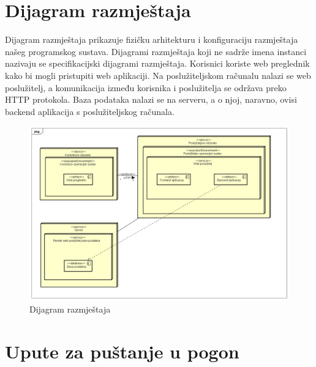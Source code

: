 			\eject 
		
		
		\section{Dijagram razmještaja}
			
		\noindent Dijagram razmještaja prikazuje fizičku arhitekturu i konfiguraciju razmještaja našeg programskog sustava. Dijagrami razmještaja koji ne sadrže imena instanci nazivaju se specifikacijski dijagrami razmještaja. Korisnici koriste web preglednik kako bi mogli pristupiti web aplikaciji. Na poslužiteljskom računalu nalazi se web poslužitelj, a komunikacija između korisnika i poslužitelja se održava preko HTTP protokola. Baza podataka nalazi se na serveru, a o njoj, naravno, ovisi backend aplikacija s poslužiteljskog računala.
			
			\begin{figure}[H]
				\centering
				\includegraphics[width=1\textwidth]{slike/dijagrami/Dijagram razmjestaja.png}
				\caption{Dijagram razmještaja}
				\label{fig:enter-label}
			\end{figure}	

			\eject 
		
		\section{Upute za puštanje u pogon}
		
		
			
